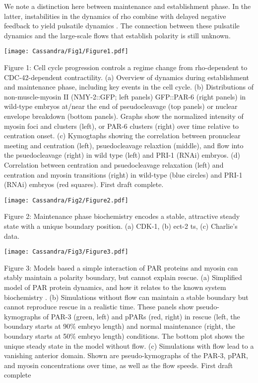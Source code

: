 \documentclass[11pt]{article}
\newcommand{\red}[1]{\color{red}#1\normalcolor}
\newcommand{\6}[1]{#1_{\text{6}}}
\newcommand{\3}[1]{#1_{\text{3}}}
\begin{document}
We note a distinction here between maintenance and establishment phase. In the latter, instabilities in the dynamics of rho combine with delayed negative feedback to yield pulsatile dynamics \citep{nishikawa2017controlling, michaux2018excitable, michaud2022versatile}. The connection between these pulsatile dynamics and the large-scale flows that establish polarity is still unknown.

\newpage 
\begin{center}
\texttt{[image: Cassandra/Fig1/Figure1.pdf]}
\end{center}

\newpage 
Figure 1: Cell cycle progression controls a regime change from rho-dependent to CDC-42-dependent contractility. (a) Overview of dynamics during establishment and maintenance phase, including key events in the cell cycle. (b) Distributions of non-muscle-myosin II (NMY-2::GFP; left panels) GFP::PAR-6 (right panels) in wild-type embryos at/near the end of pseudocleavage (top panels) or nuclear envelope breakdown (bottom panels). Graphs show the normalized intensity of myosin foci and clusters (left), or PAR-6 clusters (right) over time relative to centration onset. (c) Kymogtaphs showing the correlation between pronuclear meeting and centration (left), psuedocleavage relaxtion (middle), and flow into the psuedocleavage (right) in wild type (left) and PRI-1 (RNAi) embryos. (d) Correlation between centration and psuedocleavage relaxation (left) and centration and myosin transitions (right) in wild-type (blue circles) and PRI-1 (RNAi) embryos (red squares). \red{First draft complete.}

\newpage 
\begin{center}
\texttt{[image: Cassandra/Fig2/Figure2.pdf]}
\end{center}


\newpage
Figure 2: Maintenance phase biochemistry encodes a stable, attractive steady state with a unique boundary position. (a) CDK-1, (b) ect-2 ts, (c) Charlie's data.

\newpage 
\begin{center}
\texttt{[image: Cassandra/Fig3/Figure3.pdf]}
\end{center}


\newpage
Figure 3: Models based a simple interaction of PAR proteins and myosin can stably maintain a polarity boundary, but cannot explain rescue. (a) Simplified model of PAR protein dynamics, and how it relates to the known system biochemistry \citep{lang2017proteins}. (b) Simulations without flow can maintain a stable boundary but cannot reproduce rescue in a realistic time. These panels show pseudo-kymographs of PAR-3 (green, left) and pPARs (red, right) in rescue (left, the boundary starts at 90\% embryo length) and normal maintenance (right, the boundary starts at 50\% embryo length) conditions. The bottom plot shows the unique steady state in the model without flow. (c) Simulations with flow lead to a vanishing anterior domain. Shown are pseudo-kymographs of the PAR-3, pPAR, and myosin concentrations over time, as well as the flow speeds. \red{First draft complete}
\end{document}
